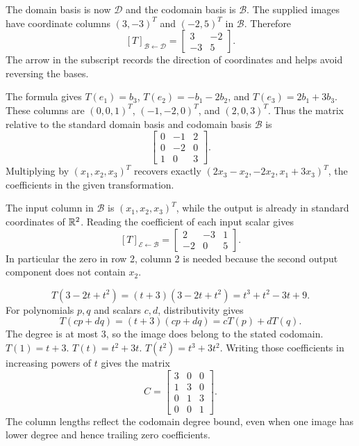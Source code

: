 The domain basis is now $\mathcal D$ and the codomain basis is $\mathcal B$. The supplied images have coordinate columns $(3,-3)^T$ and $(-2,5)^T$ in $\mathcal B$. Therefore
\[
[T]_{\mathcal B\leftarrow\mathcal D}
=\begin{bmatrix}3&-2\\-3&5\end{bmatrix}.
\]
The arrow in the subscript records the direction of coordinates and helps avoid reversing the bases.

The formula gives $T(e_1)=b_3$, $T(e_2)=-b_1-2b_2$, and $T(e_3)=2b_1+3b_3$.
These columns are $(0,0,1)^T$, $(-1,-2,0)^T$, and $(2,0,3)^T$.
Thus the matrix relative to the standard domain basis and codomain basis $\mathcal B$ is
\[
\begin{bmatrix}0&-1&2\\0&-2&0\\1&0&3\end{bmatrix}.
\]
Multiplying by $(x_1,x_2,x_3)^T$ recovers exactly $(2x_3-x_2,-2x_2,x_1+3x_3)^T$, the coefficients in the given transformation.

The input column in $\mathcal B$ is $(x_1,x_2,x_3)^T$, while the output is already in standard coordinates of $\mathbb{R}^2$. Reading the coefficient of each input scalar gives
\[
[T]_{\mathcal E\leftarrow\mathcal B}
=\begin{bmatrix}2&-3&1\\-2&0&5\end{bmatrix}.
\]
In particular the zero in row 2, column 2 is needed because the second output component does not contain $x_2$.

\[T(3-2t+t^2)=(t + 3)(3-2t+t^2)=t^{3} + t^{2} - 3 t + 9.\]
For polynomials $p,q$ and scalars $c,d$, distributivity gives
\[T(cp+dq)=(t + 3)(cp+dq)=cT(p)+dT(q).\]
The degree is at most $3$, so the image does belong to the stated codomain.
$T(1)=t + 3$. $T(t)=t^{2} + 3 t$. $T(t^{2})=t^{3} + 3 t^{2}$.
Writing those coefficients in increasing powers of $t$ gives the matrix
\[C=\begin{bmatrix}3&0&0\\1&3&0\\0&1&3\\0&0&1\end{bmatrix}.\]
The column lengths reflect the codomain degree bound, even when one image has lower degree and hence trailing zero coefficients.

